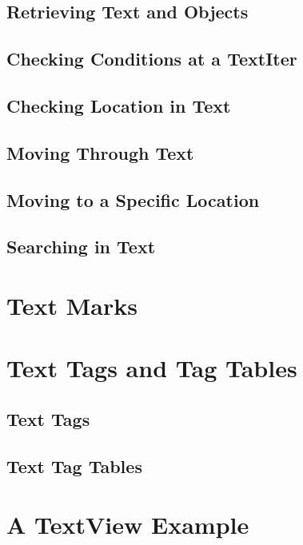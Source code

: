 \subsection{Retrieving Text and Objects}
\subsection{Checking Conditions at a TextIter}
\subsection{Checking Location in Text}
\subsection{Moving Through Text}
\subsection{Moving to a Specific Location}
\subsection{Searching in Text}
\section{Text Marks}
\section{Text Tags and Tag Tables}
\subsection{Text Tags}
\subsection{Text Tag Tables}
\section{A TextView Example}

